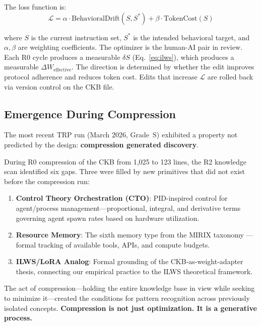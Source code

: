 \documentclass[11pt, a4paper]{article}
\begin{document}
The loss function is:
\begin{equation}
    \mathcal{L} = \alpha \cdot \text{BehavioralDrift}(S, S^*) + \beta \cdot \text{TokenCost}(S)
    \label{eq:loss}
\end{equation}

\noindent where $S$ is the current instruction set, $S^*$ is the intended behavioral target, and $\alpha, \beta$ are weighting coefficients. The optimizer is the human-AI pair in review. Each R0 cycle produces a measurable $\delta S$ (Eq.~\ref{eq:ilws}), which produces a measurable $\Delta W_{\text{effective}}$. The direction is determined by whether the edit improves protocol adherence and reduces token cost. Edits that increase $\mathcal{L}$ are rolled back via version control on the CKB file.

\subsection{Emergence During Compression}

The most recent TRP run (March 2026, Grade~S) exhibited a property not predicted by the design: \textbf{compression generated discovery}.

During R0 compression of the CKB from 1,025 to 123 lines, the R2 knowledge scan identified six gaps. Three were filled by new primitives that did not exist before the compression run:

\begin{enumerate}[leftmargin=*]
    \item \textbf{Control Theory Orchestration (CTO)}: PID-inspired control for agent/process management---proportional, integral, and derivative terms governing agent spawn rates based on hardware utilization.
    \item \textbf{Resource Memory}: The sixth memory type from the MIRIX taxonomy \citep{mirix2026}---formal tracking of available tools, APIs, and compute budgets.
    \item \textbf{ILWS/LoRA Analog}: Formal grounding of the CKB-as-weight-adapter thesis, connecting our empirical practice to the ILWS theoretical framework.
\end{enumerate}

The act of compression---holding the entire knowledge base in view while seeking to minimize it---created the conditions for pattern recognition across previously isolated concepts. \textbf{Compression is not just optimization. It is a generative process.}
\end{document}
